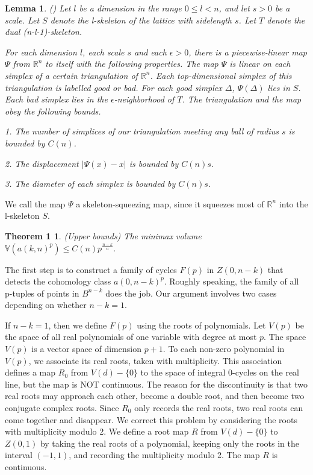 \documentclass{amsart}
\newtheorem*{reflemma}{Lemma}
\newtheorem*{Theorem 1}{Theorem 1}
\newtheorem*{Theorem 2}{Theorem 2}
\newtheorem*{Theorem 1A}{Theorem 1A}
\newtheorem*{Theorem 2A}{Theorem 2A}
\newtheorem*{vanishing lemma}{Vanishing Lemma}
\numberwithin{equation}{section}
\begin{document}
\begin{reflemma} (\cite{Gu1}) Let $l$ be a dimension in the range
$0 \le l <n$, and let $s > 0$ be a scale.  Let $S$ denote the 
l-skeleton of the lattice with sidelength $s$.  Let $T$ denote
the dual (n-l-1)-skeleton.  

For each dimension $l$, each scale $s$ and each $\epsilon > 0$, there is a
piecewise-linear map $\Psi$ from $\mathbb{R}^n$ to itself with
the following properties.  The map $\Psi$ is linear on each
simplex of a certain triangulation of $\mathbb{R}^n$.  Each
top-dimensional simplex of this triangulation is labelled good or
bad.  For each good simplex $\Delta$, $\Psi(\Delta)$ lies in $S$. 
Each bad simplex lies in the $\epsilon$-neighborhood of $T$.  
The triangulation and the map obey the following bounds.

1. The number of simplices of our triangulation meeting any ball
of radius $s$ is bounded by $C(n)$.

2. The displacement $|\Psi(x) - x|$ is bounded by $C(n) s$.

3. The diameter of each simplex is bounded by $C(n) s$.
\end{reflemma}

We call the map $\Psi$ a skeleton-squeezing map, since it squeezes most of $\mathbb{R}^n$
into the l-skeleton $S$.

\begin{Theorem 1} (Upper bounds) The minimax volume $\mathbb{V}(a(k,n)^p) \le C(n)
p^{\frac{n-k}{n}}.$
\end{Theorem 1}

\proof The first step is to construct a family of cycles $F(p)$
in $Z(0, n-k)$
that detects the cohomology class $a(0, n-k)^p$.  Roughly
speaking, the family of all p-tuples of points in $B^{n-k}$ does
the job.  Our argument involves two cases depending on whether
$n-k = 1$.

If $n-k = 1$, then we define $F(p)$ using the roots of
polynomials.  Let $V(p)$ be the space of all real polynomials of
one variable with degree at most $p$.  The space $V(p)$ is a
vector space of dimension $p+1$.  To each non-zero polynomial in
$V(p)$, we associate its real roots, taken with multiplicity. 
This association defines a map $R_0$ from $V(d) - \{ 0 \}$ to the
space of integral 0-cycles on the real line, but the map is NOT
continuous.  The reason for the discontinuity is that two real
roots may approach each other, become a double root, and then
become two conjugate complex roots.  Since $R_0$ only records the
real roots, two real roots can come together and disappear.
We correct this problem by considering the roots with
multiplicity modulo 2.  We define a root map $R$ from $V(d) - \{
0 \}$ to $Z(0,1)$ by taking the real roots of a polynomial,
keeping only the roots in the interval $(-1, 1)$, and recording
the multiplicity modulo 2.  The map $R$ is continuous.
\end{document}
